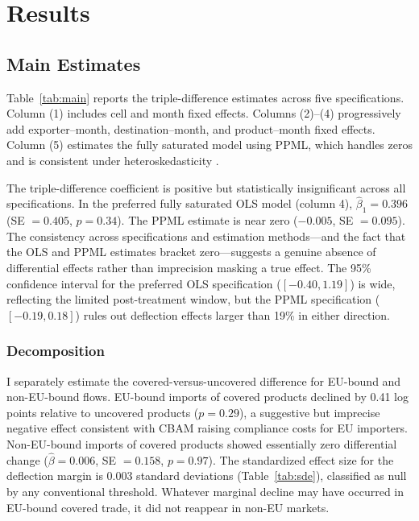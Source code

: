 \documentclass[12pt]{article}
\begin{document}
\section{Results}

\subsection{Main Estimates}

Table~\ref{tab:main} reports the triple-difference estimates across five specifications. Column (1) includes cell and month fixed effects. Columns (2)--(4) progressively add exporter--month, destination--month, and product--month fixed effects. Column (5) estimates the fully saturated model using PPML, which handles zeros and is consistent under heteroskedasticity \citep{santossilva2006}.

The triple-difference coefficient is positive but statistically insignificant across all specifications. In the preferred fully saturated OLS model (column 4), $\hat{\beta}_1 = 0.396$ (SE $= 0.405$, $p = 0.34$). The PPML estimate is near zero ($-0.005$, SE $= 0.095$). The consistency across specifications and estimation methods---and the fact that the OLS and PPML estimates bracket zero---suggests a genuine absence of differential effects rather than imprecision masking a true effect. The 95\% confidence interval for the preferred OLS specification ($[-0.40, 1.19]$) is wide, reflecting the limited post-treatment window, but the PPML specification ($[-0.19, 0.18]$) rules out deflection effects larger than 19\% in either direction.

\subsubsection*{Decomposition} I separately estimate the covered-versus-uncovered difference for EU-bound and non-EU-bound flows. EU-bound imports of covered products declined by 0.41 log points relative to uncovered products ($p = 0.29$), a suggestive but imprecise negative effect consistent with CBAM raising compliance costs for EU importers. Non-EU-bound imports of covered products showed essentially zero differential change ($\hat{\beta} = 0.006$, SE $= 0.158$, $p = 0.97$). The standardized effect size for the deflection margin is 0.003 standard deviations (Table~\ref{tab:sde}), classified as null by any conventional threshold. Whatever marginal decline may have occurred in EU-bound covered trade, it did not reappear in non-EU markets.
\end{document}
